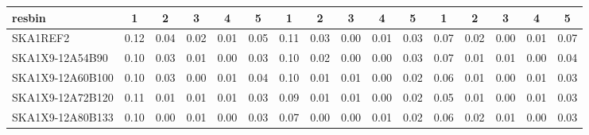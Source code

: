 \begin{table}[H]
{{\begin{tabular}{|lccccc||ccccc||ccccc|}
 resbin  &1 & 2 & 3 & 4 & 5 & 1 & 2 & 3 & 4 & 5 & 1 & 2 & 3 & 4 & 5 \\ \hline
SKA1REF2 & 0.12 \cellcolor{blue!60.00} & 0.04 \cellcolor{red!60.00} & 0.02 \cellcolor{green!60.00} & 0.01 \cellcolor{orange!60.00} & 0.05 \cellcolor{purple!60.00} & 0.11 \cellcolor{blue!60.00} & 0.03 \cellcolor{red!60.00} & 0.00 \cellcolor{green!18.00} & 0.01 \cellcolor{orange!60.00} & 0.03 \cellcolor{purple!60.00} & 0.07 \cellcolor{blue!60.00} & 0.02 \cellcolor{red!60.00} & 0.00 \cellcolor{green!18.00} & 0.01 \cellcolor{orange!60.00} & 0.07 \cellcolor{purple!60.00}\\ \hline 
SKA1X9-12A54B90 & 0.10 \cellcolor{blue!18.00} & 0.03 \cellcolor{red!49.50} & 0.01 \cellcolor{green!39.00} & 0.00 \cellcolor{orange!18.00} & 0.03 \cellcolor{purple!18.00} & 0.10 \cellcolor{blue!49.50} & 0.02 \cellcolor{red!46.00} & 0.00 \cellcolor{green!18.00} & 0.00 \cellcolor{orange!18.00} & 0.03 \cellcolor{purple!60.00} & 0.07 \cellcolor{blue!60.00} & 0.01 \cellcolor{red!18.00} & 0.01 \cellcolor{green!60.00} & 0.00 \cellcolor{orange!18.00} & 0.04 \cellcolor{purple!28.50}\\ \hline 
SKA1X9-12A60B100 & 0.10 \cellcolor{blue!18.00} & 0.03 \cellcolor{red!49.50} & 0.00 \cellcolor{green!18.00} & 0.01 \cellcolor{orange!60.00} & 0.04 \cellcolor{purple!39.00} & 0.10 \cellcolor{blue!49.50} & 0.01 \cellcolor{red!32.00} & 0.01 \cellcolor{green!60.00} & 0.00 \cellcolor{orange!18.00} & 0.02 \cellcolor{purple!18.00} & 0.06 \cellcolor{blue!39.00} & 0.01 \cellcolor{red!18.00} & 0.00 \cellcolor{green!18.00} & 0.01 \cellcolor{orange!60.00} & 0.03 \cellcolor{purple!18.00}\\ \hline 
SKA1X9-12A72B120 & 0.11 \cellcolor{blue!39.00} & 0.01 \cellcolor{red!28.50} & 0.01 \cellcolor{green!39.00} & 0.01 \cellcolor{orange!60.00} & 0.03 \cellcolor{purple!18.00} & 0.09 \cellcolor{blue!39.00} & 0.01 \cellcolor{red!32.00} & 0.01 \cellcolor{green!60.00} & 0.00 \cellcolor{orange!18.00} & 0.02 \cellcolor{purple!18.00} & 0.05 \cellcolor{blue!18.00} & 0.01 \cellcolor{red!18.00} & 0.00 \cellcolor{green!18.00} & 0.01 \cellcolor{orange!60.00} & 0.03 \cellcolor{purple!18.00}\\ \hline 
SKA1X9-12A80B133 & 0.10 \cellcolor{blue!18.00} & 0.00 \cellcolor{red!18.00} & 0.01 \cellcolor{green!39.00} & 0.00 \cellcolor{orange!18.00} & 0.03 \cellcolor{purple!18.00} & 0.07 \cellcolor{blue!18.00} & 0.00 \cellcolor{red!18.00} & 0.00 \cellcolor{green!18.00} & 0.01 \cellcolor{orange!60.00} & 0.02 \cellcolor{purple!18.00} & 0.06 \cellcolor{blue!39.00} & 0.02 \cellcolor{red!60.00} & 0.01 \cellcolor{green!60.00} & 0.00 \cellcolor{orange!18.00} & 0.03 \cellcolor{purple!18.00}\\ \hline 

\end{tabular}}}
\end{table}
